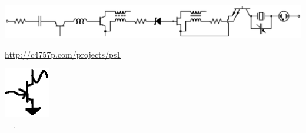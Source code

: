 
\begin{titlepage}

\makeatletter

\centering
\begin{minipage}[c][1in][c]{6in}
\vspace{-1.5in}
\includegraphics[width=\textwidth]{titlepage/border}
\end{minipage}

\vspace{-1in}
\vspace*{\fill}
\begin{center}
{\LARGE\@title}

\vspace{10mm}

\url{http://c4757p.com/projects/ps1}

\end{center}
\vspace*{\fill}

\vspace{-1in}
\begin{minipage}[c][1in][c]{\textwidth}
\begin{center}
\includegraphics[width=20mm]{titlepage/logo} \\
\textcopyright ~\the\year ~\@author.
\end{center}
\end{minipage}

\makeatother

\end{titlepage}
